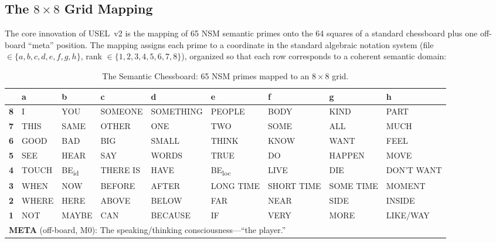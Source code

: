 \documentclass[11pt,a4paper]{article}
\begin{document}
\subsection{The $8 \times 8$ Grid Mapping}
\label{sec:grid-mapping}

The core innovation of USEL~v2 is the mapping of 65 NSM semantic primes onto the 64 squares of a standard chessboard plus one off-board ``meta'' position. The mapping assigns each prime to a coordinate in the standard algebraic notation system (file $\in \{a, b, c, d, e, f, g, h\}$, rank $\in \{1, 2, 3, 4, 5, 6, 7, 8\}$), organized so that each row corresponds to a coherent semantic domain:

\begin{table}[h!]
\centering
\caption{The Semantic Chessboard: 65 NSM primes mapped to an $8 \times 8$ grid.}
\label{tab:semantic-chessboard}
\small
\begin{tabular}{c|llllllll}
\toprule
 & \textbf{a} & \textbf{b} & \textbf{c} & \textbf{d} & \textbf{e} & \textbf{f} & \textbf{g} & \textbf{h} \\
\midrule
\textbf{8} & I & YOU & SOMEONE & SOMETHING & PEOPLE & BODY & KIND & PART \\
\textbf{7} & THIS & SAME & OTHER & ONE & TWO & SOME & ALL & MUCH \\
\textbf{6} & GOOD & BAD & BIG & SMALL & THINK & KNOW & WANT & FEEL \\
\textbf{5} & SEE & HEAR & SAY & WORDS & TRUE & DO & HAPPEN & MOVE \\
\textbf{4} & TOUCH & BE\textsubscript{id} & THERE IS & HAVE & BE\textsubscript{loc} & LIVE & DIE & DON'T WANT \\
\textbf{3} & WHEN & NOW & BEFORE & AFTER & LONG TIME & SHORT TIME & SOME TIME & MOMENT \\
\textbf{2} & WHERE & HERE & ABOVE & BELOW & FAR & NEAR & SIDE & INSIDE \\
\textbf{1} & NOT & MAYBE & CAN & BECAUSE & IF & VERY & MORE & LIKE/WAY \\
\bottomrule
\multicolumn{9}{l}{\small \textbf{META} (off-board, M0): The speaking/thinking consciousness---``the player.''} \\
\end{tabular}
\end{table}
\end{document}
